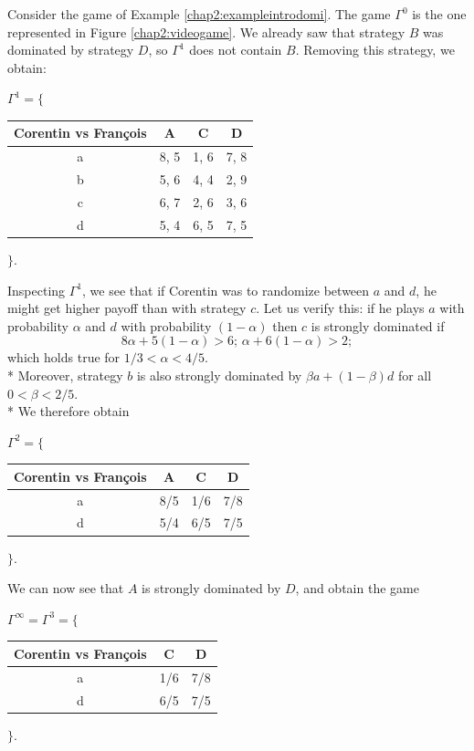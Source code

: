 \begin{example}
Consider the game of Example \ref{chap2:exampleintrodomi}.
The game $\Gamma^0$ is the one represented in Figure \ref{chap2:videogame}.
We already saw that strategy $B$ was dominated by strategy $D$, so $\Gamma^1$ does not contain $B$. Removing this strategy, we obtain:
\begin{center}
$\Gamma^1 = \Bigg \{$
\begin{tabular}{c|ccc}
  Corentin vs Fran\c{c}ois &  A   & C & D\\ 
\hline a & 8, 5  & 1, 6 & 7, 8 \\
 b & 5, 6  & 4, 4 & 2, 9 \\
 c & 6, 7  & 2, 6 & 3, 6 \\
 d & 5, 4  & 6, 5 & 7, 5 \\
\end{tabular} 
$\Bigg \}.$
\end{center}

Inspecting $\Gamma^1$, we see that if Corentin was to randomize between $a$ and $d$, he might get higher payoff than with strategy $c$. 
Let us verify this: if he plays $a$ with probability $\alpha$ and $d$ with probability $(1-\alpha)$ then $c$ is strongly dominated if 
$$ 8\alpha + 5(1-\alpha) > 6; \, \alpha + 6(1-\alpha) > 2; $$
which holds true for $ 1/3 < \alpha < 4/5$.\\*
Moreover, strategy $b$ is also strongly dominated by $\beta a + (1-\beta) d$ for all $ 0 < \beta < 2 /5$.\\*
We therefore obtain
\begin{center}
$\Gamma^2 = \Bigg \{$
\begin{tabular}{c|ccc}
  Corentin vs Fran\c{c}ois &  A   & C & D\\ 
\hline a & 8/5  & 1/6 & 7/8 \\
 d & 5/4  & 6/5 & 7/5 \\
\end{tabular} 
$\Bigg \}.$
\end{center}

We can now see that $A$ is strongly dominated by $D$, and obtain the game 
\begin{center}
$\Gamma^{\infty}  = \Gamma^3 = \Bigg \{$
\begin{tabular}{c|cc}
  Corentin vs Fran\c{c}ois   & C & D\\ 
\hline a  & 1/6 & 7/8 \\
 d   & 6/5 & 7/5 \\
\end{tabular} 
$\Bigg \}.$
\end{center}


\end{example}
